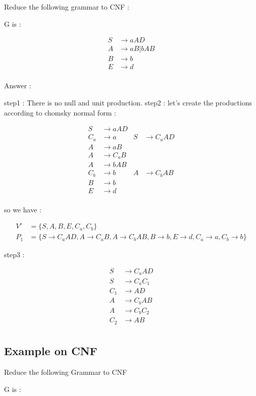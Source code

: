 \documentclass[12pt]{book}
\begin{document}
Reduce the following grammar to CNF :

G is :

\begin{align*}
S &\to aAD \\
A &\to aB | bAB \\
B &\to b \\
E &\to d \\
\end{align*}

Answer : 

step1 : There is no null and unit production.
step2 : let's create the productions according to chomsky normal form :

\begin{align*}
S &\to aAD \\
C_{a} &\to a & S &\to C_{a}AD \\
A &\to aB  \\
A &\to C_{a}B \\
A &\to bAB \\
C_{b} &\to b & A &\to C_{b}AB \\
B &\to b \\
E &\to d \\
\end{align*}

so we have :

\begin{align*}
V' &= \{ S, A, B, E, C_{a}, C_{b} \} \\
P_{1} &= \{ S \to C_{a}AD , A \to C_{a}B ,  A \to C_{b}AB , B \to b , E \to d , C_{a} \to a , C_{b} \to b \}
\end{align*}


step3 : 

\begin{align*}
S &\to C_{a}AD \\
S &\to C_{a}C_{1} \\
C_{1} &\to AD \\
A &\to C_{b}AB \\
A &\to C_{b}C_{2} \\
C_{2} &\to AB \\
\end{align*}


\subsection{Example on CNF}

Reduce the following Grammar to CNF 

G is :
\end{document}
